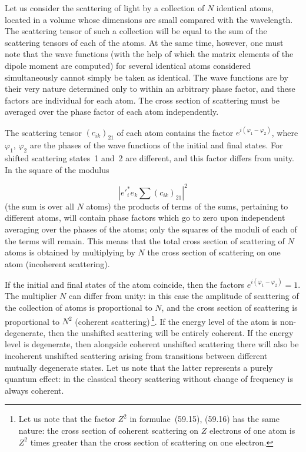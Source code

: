 Let us consider the scattering of light by a collection of $N$ identical atoms, located in a volume whose dimensions are small compared with the wavelength. The scattering tensor of such a collection will be equal to the sum of the scattering tensors of each of the atoms. At the same time, however, one must note that the wave functions (with the help of which the matrix elements of the dipole moment are computed) for several identical atoms considered simultaneously cannot simply be taken as identical. The wave functions are by their very nature determined only to within an arbitrary phase factor, and these factors are individual for each atom. The cross section of scattering must be averaged over the phase factor of each atom independently.

The scattering tensor $(c_{ik})_{21}$ of each atom contains the factor $e^{i(\varphi_1 - \varphi_2)}$, where $\varphi_1$, $\varphi_2$ are the phases of the wave functions of the initial and final states. For shifted scattering states~1 and~2 are different, and this factor differs from unity. In the square of the modulus

\[
|e'^*_i e_k\sum(c_{ik})_{21}|^2
\]
(the sum is over all $N$ atoms) the products of terms of the sums, pertaining to different atoms, will contain phase factors which go to zero upon independent averaging over the phases of the atoms; only the squares of the moduli of each of the terms will remain. This means that the total cross section of scattering of $N$ atoms is obtained by multiplying by $N$ the cross section of scattering on one atom (incoherent scattering).

If the initial and final states of the atom coincide, then the factors $e^{i(\varphi_1 - \varphi_2)} = 1$. The multiplier $N$ can differ from unity: in this case the amplitude of scattering of the collection of atoms is proportional to $N$, and the cross section of scattering is proportional to $N^2$ (coherent scattering)\,\footnote{Let us note that the factor $Z^2$ in formulae~(59.15), (59.16) has the same nature: the cross section of coherent scattering on $Z$ electrons of one atom is $Z^2$ times greater than the cross section of scattering on one electron.}. If the energy level of the atom is non-degenerate, then the unshifted scattering will be entirely coherent. If the energy level is degenerate, then alongside coherent unshifted scattering there will also be incoherent unshifted scattering arising from transitions between different mutually degenerate states. Let us note that the latter represents a purely quantum effect: in the classical theory scattering without change of frequency is always coherent.

